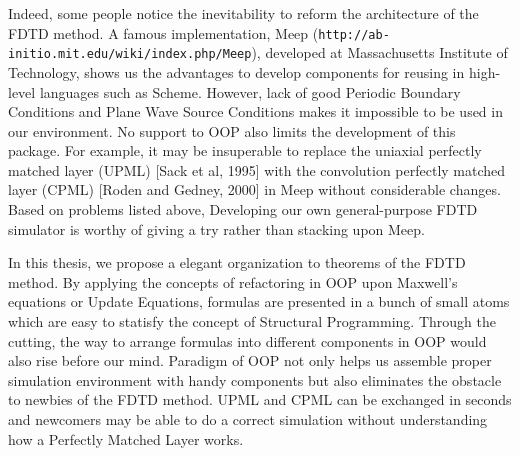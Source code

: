 Indeed, some people notice the inevitability to reform the architecture of the FDTD method. A famous implementation, Meep
(\texttt{http://ab-initio.mit.edu/wiki/index.php/Meep}), developed at Massachusetts Institute of Technology, shows us the
advantages to develop components for reusing in high-level languages such as Scheme. However, lack of good Periodic
Boundary Conditions and Plane Wave Source Conditions makes it impossible to be used in our environment. No support to
OOP also limits the development of this package. For example, it may be insuperable to replace the uniaxial perfectly matched layer (UPML) [Sack et al, 1995] with the convolution perfectly matched layer (CPML) [Roden and Gedney, 2000] in Meep
without considerable changes. Based on problems listed above, Developing our own general-purpose FDTD simulator is worthy of
giving a try rather than stacking upon Meep. 

In this thesis, we propose a elegant organization to theorems of the FDTD method. By applying the concepts of refactoring in OOP
upon Maxwell's equations or Update Equations, formulas are presented in a bunch of small atoms which are easy to
statisfy the concept of Structural Programming. Through the cutting, the way to arrange formulas into different
components in OOP would also rise before our mind. Paradigm of OOP not only helps us assemble proper simulation
environment with handy components but also eliminates the obstacle to newbies of the FDTD method. UPML and CPML can be exchanged in
seconds and newcomers may be able to do a correct simulation without understanding how a Perfectly Matched Layer works.
